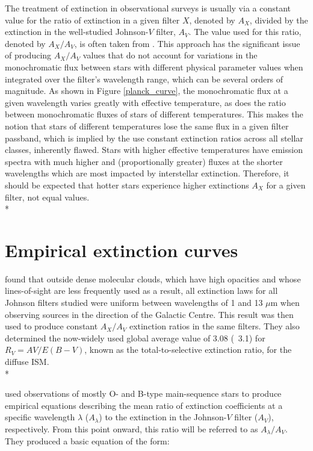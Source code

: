 \documentclass[12pt, a4paper]{report}
\begin{document}
The treatment of extinction in observational surveys is usually via a constant value for the ratio of extinction in a given filter $X$, denoted by $A_{X}$, divided by the extinction in the well-studied Johnson-$V$ filter, $A_{V}$. The value used for this ratio, denoted by $A_{X}/A_{V}$, is often taken from \cite{1985ApJ...288..618R}. This approach has the significant issue of producing $A_{X}/A_{V}$ values that do not account for  variations in the monochromatic flux between stars with different physical parameter values when integrated over the filter's wavelength range, which can be several orders of magnitude. As shown in Figure \ref{planck_curve}, the monochromatic flux at a given wavelength varies greatly with effective temperature, as does the ratio between monochromatic fluxes of stars of different temperatures. This makes the notion that stars of different temperatures lose the same flux in a given filter passband, which is implied by the use constant extinction ratios across all stellar classes, inherently flawed. Stars with higher effective temperatures have emission spectra with much higher and (proportionally greater) fluxes at the shorter wavelengths which are most impacted by interstellar extinction. Therefore, it should be expected that hotter stars experience higher extinctions $A_{X}$ for a given filter, not equal values.\\*

\section{Empirical extinction curves}
\cite{1985ApJ...288..618R} found that outside dense molecular clouds, which have high opacities and whose lines-of-sight are less frequently used as a result, all extinction laws for all Johnson filters studied were uniform between wavelengths of 1 and 13 $\mu$m when observing sources in the direction of the Galactic Centre. This result was then used to produce constant $A_{X}/A_{V}$ extinction ratios in the same filters. They also determined the now-widely used global average value of 3.08 (~3.1) for $R_{V} = A{V}/E(B-V)$, known as the total-to-selective extinction ratio,  for the diffuse ISM. \\*

\cite{1989ApJ...345..245C} used observations of mostly O- and B-type main-sequence stars to produce empirical equations describing the mean ratio of extinction coefficients at a specific wavelength $\lambda$ ($A_{\lambda}$) to the extinction in the Johnson-$V$ filter ($A_{V}$), respectively. From this point onward, this ratio will be referred to as $A_{\lambda}/A_{V}$. They produced a basic equation of the form:
\end{document}
